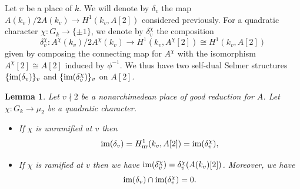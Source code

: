 \documentclass[10pt]{amsart}
\numberwithin{equation}{section}
\newtheorem{lemma}[equation]{Lemma}
\theoremstyle{remark}
\theoremstyle{definition}
\theoremstyle{definition}
\theoremstyle{definition}
\theoremstyle{definition}
\theoremstyle{definition}
\theoremstyle{definition}
\theoremstyle{definition}
\theoremstyle{definition}
\begin{document}
	Let $v$ be a place of $k$. We will denote by $\delta_v$ the map $A(k_v)/2A(k_v)\to H^1(k_v,A[2])$ considered previously. For a quadratic character $\chi:G_k\to \{\pm 1\}$, we  denote by $\delta_v^\chi$ the composition
\[\delta_v^\chi:A^\chi(k_v)/2A^\chi(k_v)\to H^1(k_v,A^\chi[2])\cong H^1(k_v,A[2])\]
given by composing the connecting map for $A^\chi$ with the isomorphism $A^\chi[2]\cong A[2]$ induced by $\phi^{-1}$. We thus have two self-dual Selmer structures $\{\textup{im}(\delta_v)\}_v$ and $\{\textup{im}(\delta_v^\chi)\}_v$ on $A[2]$. %




\begin{lemma} \label{lem:local_conds}
Let $v\nmid 2$ be a nonarchimedean place of good reduction for $A$. Let $\chi:G_k\to \mu_2$ be a quadratic character. 
\begin{itemize}
\item[(i)] If $\chi$ is unramified at $v$ then 
\[\textup{im}(\delta_v)=H^1_{\textup{ur}}(k_v,A[2])=\textup{im}(\delta_v^\chi),\]
\item[(ii)] If $\chi$ is ramified at $v$ then we have $\textup{im}(\delta_v^\chi)=\delta_v^\chi(A(k_v)[2])$. Moreover, we have 
\[\textup{im}(\delta_v)\cap \textup{im}(\delta_v^\chi)=0.\]
\end{itemize}
\end{lemma}
\end{document}

